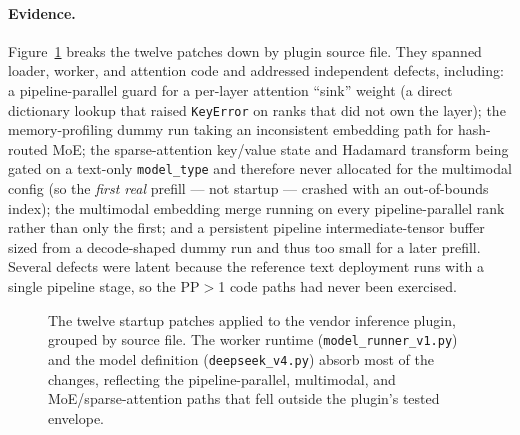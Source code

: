 \documentclass{article}
\newcommand{\code}[1]{\texttt{#1}}
\begin{document}
\paragraph{Evidence.} Figure~\ref{fig:patches} breaks the twelve patches down by
plugin source file. They spanned loader, worker, and attention code and addressed
independent defects, including: a pipeline-parallel guard for a per-layer
attention ``sink'' weight (a direct dictionary lookup that raised \code{KeyError}
on ranks that did not own the layer); the memory-profiling dummy run taking an
inconsistent embedding path for hash-routed MoE; the sparse-attention key/value
state and Hadamard transform being gated on a text-only \code{model\_type} and
therefore never allocated for the multimodal config (so the \emph{first real}
prefill --- not startup --- crashed with an out-of-bounds index); the multimodal
embedding merge running on every pipeline-parallel rank rather than only the
first; and a persistent pipeline intermediate-tensor buffer sized from a
decode-shaped dummy run and thus too small for a later prefill. Several defects
were latent because the reference text deployment runs with a single pipeline
stage, so the PP$>$1 code paths had never been exercised.

\begin{figure}[t]
\centering
{}
\caption{The twelve startup patches applied to the vendor inference plugin,
grouped by source file. The worker runtime (\code{model\_runner\_v1.py}) and the
model definition (\code{deepseek\_v4.py}) absorb most of the changes, reflecting
the pipeline-parallel, multimodal, and MoE/sparse-attention paths that fell
outside the plugin's tested envelope.}
\label{fig:patches}
\end{figure}
\end{document}
